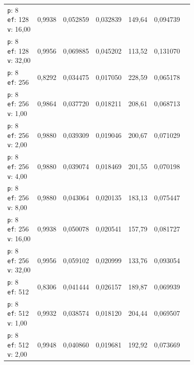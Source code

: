 \begin{table}[htbp]
\begin{tabularx}{\textwidth}{Xrrrrrr}
    \makecell{\texttt{p}: 8\\\texttt{ef}: 128\\\texttt{v}: 16,00} & 0,9938 & 0,052859 & 0,032839 & 149,64 & 0,094739 \\
    \makecell{\texttt{p}: 8\\\texttt{ef}: 128\\\texttt{v}: 32,00} & 0,9956 & 0,069885 & 0,045202 & 113,52 & 0,131070 \\
    \makecell{\texttt{p}: 8\\\texttt{ef}: 256} & 0,8292 & 0,034475 & 0,017050 & 228,59 & 0,065178 \\
    \makecell{\texttt{p}: 8\\\texttt{ef}: 256\\\texttt{v}: 1,00} & 0,9864 & 0,037720 & 0,018211 & 208,61 & 0,068713 \\
    \makecell{\texttt{p}: 8\\\texttt{ef}: 256\\\texttt{v}: 2,00} & 0,9880 & 0,039309 & 0,019046 & 200,67 & 0,071029 \\
    \makecell{\texttt{p}: 8\\\texttt{ef}: 256\\\texttt{v}: 4,00} & 0,9880 & 0,039074 & 0,018469 & 201,55 & 0,070198 \\
    \makecell{\texttt{p}: 8\\\texttt{ef}: 256\\\texttt{v}: 8,00} & 0,9880 & 0,043064 & 0,020135 & 183,13 & 0,075447 \\
    \makecell{\texttt{p}: 8\\\texttt{ef}: 256\\\texttt{v}: 16,00} & 0,9938 & 0,050078 & 0,020541 & 157,79 & 0,081727 \\
    \makecell{\texttt{p}: 8\\\texttt{ef}: 256\\\texttt{v}: 32,00} & 0,9956 & 0,059102 & 0,020999 & 133,76 & 0,093054 \\
    \makecell{\texttt{p}: 8\\\texttt{ef}: 512} & 0,8306 & 0,041444 & 0,026157 & 189,87 & 0,069939 \\
    \makecell{\texttt{p}: 8\\\texttt{ef}: 512\\\texttt{v}: 1,00} & 0,9932 & 0,038574 & 0,018120 & 204,44 & 0,069507 \\
    \makecell{\texttt{p}: 8\\\texttt{ef}: 512\\\texttt{v}: 2,00} & 0,9948 & 0,040860 & 0,019681 & 192,92 & 0,073669 \\

\end{tabularx}
\end{table}
